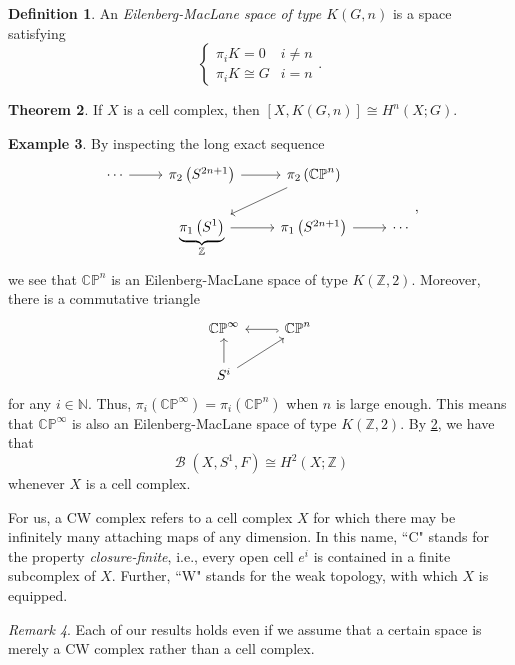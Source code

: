 \documentclass[10pt,letterpaper,cm]{nupset}
\theoremstyle{definition}
\newtheorem{defn}{Definition}[subsection]
\newtheorem{exmp}[defn]{Example}
\theoremstyle{theorem}
\newtheorem{theorem}[defn]{Theorem}
\theoremstyle{remark}
\newtheorem{remark}[defn]{Remark}
\newcommand{\CP}{\mathbb{CP}}
\newcommand{\N}{\mathbb N}
\newcommand{\Z}{\mathbb Z}
\newcommand{\1}{\mathbb{1}}
\newcommand{\0}{\vec 0}
\DeclareMathOperator{\B}{\mathcal{B}}
\begin{document}
\begin{defn}
An \textit{Eilenberg-MacLane space of type $K\left(G, n\right)$} is a space satisfying 
\[
\begin{cases}
\pi_i{K} = 0 & i \ne n
\\ \pi_i{K} \cong G & i =n
\end{cases}.
\]
\end{defn}

\begin{theorem}\label{EM}
If $X$ is a cell complex, then $\left[X, K\left(G, n\right)\right] \cong H^n\left(X; G\right)$.
\end{theorem}

\begin{exmp}
By inspecting the long exact sequence
\[
\begin{tikzcd}
\cdots \arrow[r] & \pi_2\left(S^{2n+1}\right) \arrow[r]              & \pi_2\left(\CP^n\right) \arrow[ld]   &        \\
                 & \underbrace{\pi_1\left(S^1\right)}_{\Z} \arrow[r] & \pi_1\left(S^{2n+1}\right) \arrow[r] & \cdots
\end{tikzcd}
,\] we see that $\CP^n$ is an Eilenberg-MacLane space of type $K\left(\Z, 2\right)$. Moreover, there is a commutative triangle
\[
\begin{tikzcd}
\CP^{\infty}             & \CP^n \arrow[l, hook] \\
S^i \arrow[u] \arrow[ru] &                      
\end{tikzcd}
\] for any $i\in \N$. Thus, $\pi_i\left(\CP^{\infty}\right) = \pi_i\left(\CP^n\right)$ when $n$ is large enough. This means that $\CP^{\infty}$ is also 
an Eilenberg-MacLane space of type $K\left(\Z, 2\right)$. By \cref{EM}, we have that $$\B\left(X, S^1, F\right) \cong H^2\left(X; \Z\right)$$ whenever $X$ is a cell complex. 
\end{exmp}

For us, a CW complex refers to a cell complex $X$ for which there may be infinitely many attaching maps of any dimension. In this name, ``C" stands for the property \textit{closure-finite}, i.e., every open cell $e^i$ is contained in a finite subcomplex of $X$. Further, ``W" stands for the weak topology, with which $X$ is equipped.

\begin{remark}
Each of our results holds even if we assume that a certain space is merely a CW complex rather than a cell complex. 
\end{remark}
\end{document}
